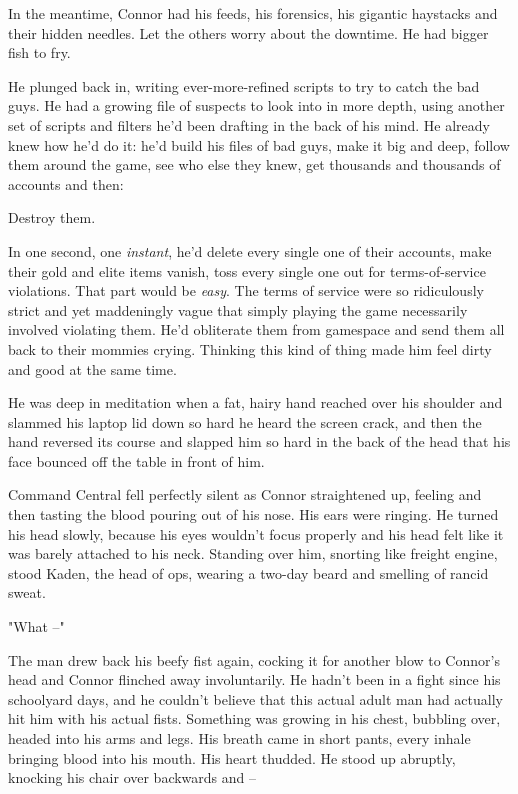 In the meantime, Connor had his feeds, his forensics, his gigantic
haystacks and their hidden needles. Let the others worry about the
downtime. He had bigger fish to fry.

He plunged back in, writing ever-more-refined scripts to try to
catch the bad guys. He had a growing file of suspects to look into
in more depth, using another set of scripts and filters he'd been
drafting in the back of his mind. He already knew how he'd do it:
he'd build his files of bad guys, make it big and deep, follow them
around the game, see who else they knew, get thousands and
thousands of accounts and then:

Destroy them.

In one second, one \emph{instant}, he'd delete every single one of
their accounts, make their gold and elite items vanish, toss every
single one out for terms-of-service violations. That part would be
\emph{easy}. The terms of service were so ridiculously strict and
yet maddeningly vague that simply playing the game necessarily
involved violating them. He'd obliterate them from gamespace and
send them all back to their mommies crying. Thinking this kind of
thing made him feel dirty and good at the same time.

He was deep in meditation when a fat, hairy hand reached over his
shoulder and slammed his laptop lid down so hard he heard the
screen crack, and then the hand reversed its course and slapped him
so hard in the back of the head that his face bounced off the table
in front of him.

Command Central fell perfectly silent as Connor straightened up,
feeling and then tasting the blood pouring out of his nose. His
ears were ringing. He turned his head slowly, because his eyes
wouldn't focus properly and his head felt like it was barely
attached to his neck. Standing over him, snorting like freight
engine, stood Kaden, the head of ops, wearing a two-day beard and
smelling of rancid sweat.

"What --"

The man drew back his beefy fist again, cocking it for another blow
to Connor's head and Connor flinched away involuntarily. He hadn't
been in a fight since his schoolyard days, and he couldn't believe
that this actual adult man had actually hit him with his actual
fists. Something was growing in his chest, bubbling over, headed
into his arms and legs. His breath came in short pants, every
inhale bringing blood into his mouth. His heart thudded. He stood
up abruptly, knocking his chair over backwards and --

